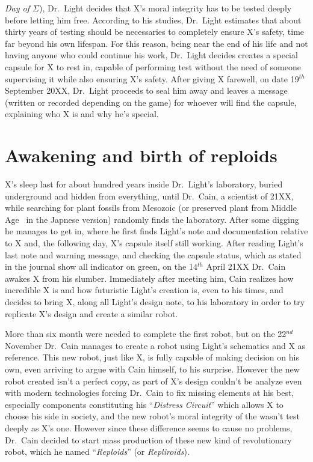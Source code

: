 \emph{Day of $\Sigma$}), Dr.~Light decides that X's moral integrity has to be tested deeply before letting him free. According to his studies, Dr.~Light estimates that about thirty years of testing should be necessaries to completely ensure X's safety, time far beyond his own lifespan. For this reason, being near the end of his life and not having anyone who could continue his work, Dr.~Light decides creates a special capsule for X to rest in, capable of performing test without the need of someone supervising it while also ensuring X's safety. After giving X farewell, on date 19$^{th}$ September 20XX, Dr.~Light proceeds to seal him away and leaves a message (written or recorded depending on the game) for whoever will find the capsule, explaining who X is and why he's special.

\section{Awakening and birth of reploids}
X's sleep last for about hundred years inside Dr.~Light's laboratory, buried underground and hidden from everything, until Dr.~Cain, a scientist of 21XX, while searching for plant fossils  from Mesozoic (or preserved plant from Middle Age~\cite{elysium_Cain_journal} in the Japnese version) randomly finds the laboratory. After some digging he manages to get in, where he first finds Light's note and documentation relative to X and, the following day, X's capsule itself still working. After reading Light's last note and warning message, and checking the capsule status, which as stated in the journal show all indicator on green, on the 14$^{th}$ April 21XX Dr.~Cain awakes X from his slumber. Immediately after meeting him, Cain realizes how incredible X is and how futuristic Light's creation  is, even to his times, and decides to bring X, along all Light's design note, to his laboratory in order to try replicate X's design and create a similar robot.

More than six month were needed to complete the first robot, but on the 22$^{nd}$ November Dr.~Cain manages to create a robot using Light's schematics and X as reference. This new robot, just like X, is fully capable of making decision on his own, even arriving to argue with Cain himself, to his surprise. However the new robot created isn't a perfect copy, as part of X's design couldn't be analyze even with modern technologies forcing Dr.~Cain to fix missing elements at his best, especially components constituting his ``\emph{Distress Circuit}''\cite{book:RMZ_Complete_works} which allows X to choose his side in society, and the new robot's moral integrity of the wasn't test deeply as X's one. However since these difference seems to cause no problems, Dr.~Cain decided to start mass production of these new kind of revolutionary robot, which he named ``\emph{Reploids}''  (or \emph{Repliroids}).

